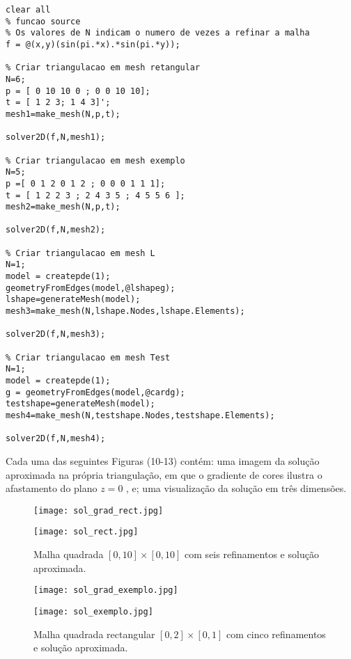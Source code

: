 \documentclass{article}
\theoremstyle{definition}
\theoremstyle{plain}
\numberwithin{equation}{section}
\newcommand{\tab}{\hspace{10mm}}
\begin{document}
\vspace{5mm}
\begin{lstlisting}[frame=single]
clear all
% funcao source
% Os valores de N indicam o numero de vezes a refinar a malha
f = @(x,y)(sin(pi.*x).*sin(pi.*y));

% Criar triangulacao em mesh retangular
N=6;
p = [ 0 10 10 0 ; 0 0 10 10];
t = [ 1 2 3; 1 4 3]';
mesh1=make_mesh(N,p,t);

solver2D(f,N,mesh1);

% Criar triangulacao em mesh exemplo
N=5;
p =[ 0 1 2 0 1 2 ; 0 0 0 1 1 1];
t = [ 1 2 2 3 ; 2 4 3 5 ; 4 5 5 6 ];
mesh2=make_mesh(N,p,t);

solver2D(f,N,mesh2);

% Criar triangulacao em mesh L
N=1;
model = createpde(1);
geometryFromEdges(model,@lshapeg);
lshape=generateMesh(model);
mesh3=make_mesh(N,lshape.Nodes,lshape.Elements);

solver2D(f,N,mesh3);

% Criar triangulacao em mesh Test
N=1;
model = createpde(1);
g = geometryFromEdges(model,@cardg);
testshape=generateMesh(model);
mesh4=make_mesh(N,testshape.Nodes,testshape.Elements);

solver2D(f,N,mesh4);
\end{lstlisting}
\vspace{10mm}

\tab Cada uma das seguintes Figuras (10-13) contém: uma imagem da solução aproximada na própria triangulação, em que o gradiente de cores ilustra o afastamento do plano $z=0$ , e; uma visualização da solução em três dimensões.

\vspace{10mm}

\begin{figure} [H]
\centering
\begin{minipage}{0.5\textwidth}
  \centering
  \texttt{[image: sol\_grad\_rect.jpg]}
\end{minipage}%
\begin{minipage}{0.5\textwidth}
  \centering
  \texttt{[image: sol\_rect.jpg]}
\end{minipage}
\caption{ Malha quadrada $ [0, 10] × [0, 10] $ com seis refinamentos e solução aproximada.}
\end{figure}


\vspace{15mm}

\begin{figure} [H]
\centering
\begin{minipage}{0.5\textwidth}
  \centering
  \texttt{[image: sol\_grad\_exemplo.jpg]}
\end{minipage}%
\begin{minipage}{0.5\textwidth}
  \centering
  \texttt{[image: sol\_exemplo.jpg]}
\end{minipage}
\caption{ Malha quadrada rectangular $ [0, 2] × [0, 1] $ com cinco refinamentos e solução aproximada.}
\end{figure}
\end{document}

